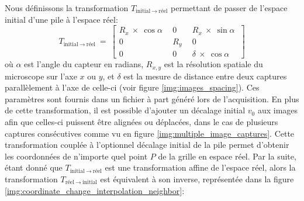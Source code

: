 {{{            Nous définissons la transformation $T_{\text{initial}~\rightarrow~\text{réel}}$ permettant de passer de l'espace initial d'une pile à l'espace réel: %
            $$
            T_{\text{initial}~\rightarrow~\text{réel}}~=~\begin{bmatrix}
            R_x~\times~\cos{\alpha}~&~0~&~R_x~\times~\sin{\alpha}~\\
            0~&~R_y~&~0~\\
            0~&~0~&~\delta~\times~\cos{\alpha}
            \end{bmatrix}
		    $$
            où $\alpha$ est l'angle du capteur en radians, $R_{x,y}$ est la résolution spatiale du microscope sur l'axe $x$ ou $y$, et $\delta$ est la mesure de distance entre deux captures parallèlement à l'axe de celle-ci (voir figure \ref{img:images_spacing}). Ces paramètres sont fournis dans un fichier à part généré lors de l'acquisition. En plus de cette transformation, il est possible d'ajouter un décalage initial $v_0$ aux images afin que celles-ci puissent être alignées ou déplacées, dans le cas de plusieurs captures consécutives comme vu en figure \ref{img:multiple_image_captures}. Cette transformation couplée à l'optionnel décalage initial de la pile permet d'obtenir les coordonnées de n'importe quel point $P$ de la grille en espace réel. Par la suite, étant donné que $T_{\text{initial}~\rightarrow~\text{réel}}$ est une transformation affine de l'espace réel, alors la transformation $T_{\text{réel}~\rightarrow~\text{initial}}$ est équivalent à son inverse, représentée dans la figure \ref{img:coordinate_change_interpolation_neighbor}:
}}}

